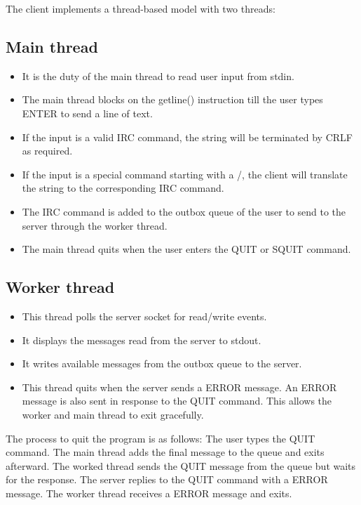\documentclass[letterpaper,twocolumn,10pt]{article}
\begin{document}
The client implements a thread-based model with two threads:

\subsection{Main thread}

\begin{itemize}
	\item It is the duty of the main thread to read user input from stdin.
	\item The main thread blocks on the getline() instruction till the user types ENTER to send a line of text.
	\item If the input is a valid IRC
	      command, the string will be terminated by CRLF as required.
	\item If the input is a special command starting with a /, the client will
	      translate the string to the corresponding IRC command.
	\item The IRC command is added to the outbox queue of the user to send to the server through the worker thread.
	\item The main thread quits when the user enters the QUIT or SQUIT command.
\end{itemize}

\subsection{Worker thread}

\begin{itemize}
	\item This thread polls the server socket for read/write events.
	\item It displays the messages read from the server to stdout.
	\item It writes available messages from the outbox queue to the server.
	\item This thread quits when the server sends a ERROR message.
	      An ERROR message is also sent in response to the QUIT command. This allows the worker and main thread to exit gracefully.
\end{itemize}

The process to quit the program is as follows: The user types the
QUIT command. The main thread adds the final message to the queue and exits afterward. The worked thread sends
the QUIT message from the queue but waits for the response. The server replies to the QUIT command with a
ERROR message. The worker thread receives a ERROR message and exits.
\end{document}

